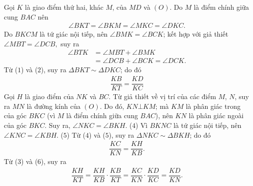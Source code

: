 \begin{multicols}{2}
\begin{figure}[H]
		\vspace*{-20pt}
	\end{figure}
	Gọi $K$ là giao điểm thứ hai, khác $M$, của $MD$ và $(O)$.
	\vskip 0.05cm
	Do $M$ là điểm chính giữa cung $BAC$ nên
	\begin{align*}
		\angle BKT \!=\! \angle BKM \!=\! \angle MKC \!=\! \angle DKC. \tag{$1$}
	\end{align*}
	Do $BKCM$ là tứ giác nội tiếp, nên $\angle BMK = \angle BCK$; kết hợp với giả thiết $\angle MBT = \angle DCB,$  suy ra
	\begin{align*}
		\angle BTK &= \angle MBT + \angle BMK \\
		&= \angle DCB + \angle BCK = \angle DCK. \tag{$2$}
	\end{align*}
	Từ ($1$) và ($2$), suy ra $\Delta BKT \sim  \Delta DKC$; do đó
	\begin{align*}
		\dfrac{{KB}}{{KT}} = \dfrac{{KD}}{{KC}} \tag{$3$}
	\end{align*}
	Gọi $H$ là giao điểm của $NK$ và $BC$.
	\vskip 0.05cm
	Từ giả thiết về vị trí của các điểm $M$, $N$, suy ra $MN$ là đường kính của $(O)$. Do đó, $KN \bot KM$; mà $KM$ là phân giác trong của góc $BKC$ (vì $M$ là điểm chính giữa cung $BAC$), nên $KN$ là phân giác ngoài của góc $BKC$. Suy ra, $\angle NKC = \angle BKH$. \hfill ($4$)
	\vskip 0.05cm 
	Vì $BKNC$ là tứ giác nội tiếp, nên $\angle KNC = \angle KBH.$ \hfill ($5$)
	\vskip 0.05cm
	Từ ($4$) và ($5$), suy ra $\Delta NKC \sim \Delta BKH$; do đó
	\begin{align*}
		\dfrac{{KC}}{{KN}} = \dfrac{{KH}}{{KB}}. \tag{$6$}
	\end{align*}
	Từ ($3$) và ($6$), suy ra
	\begin{align*}
		\dfrac{{KH}}{{KT}} = \dfrac{{KH}}{{KB}} \cdot \dfrac{{KB}}{{KT}} = \dfrac{{KC}}{{KN}} \cdot \dfrac{{KD}}{{KC}} = \dfrac{{KD}}{{KN}}.
	\end{align*}

\end{multicols}
